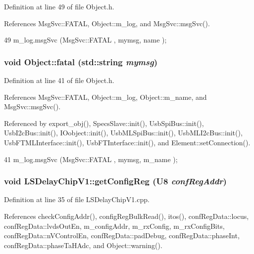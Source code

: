 Definition at line 49 of file Object.h.

References MsgSvc::FATAL, Object::m\_\-log, and MsgSvc::msgSvc().


\begin{DoxyCode}
49 { m_log.msgSvc (MsgSvc::FATAL   , mymsg, name ); }
\end{DoxyCode}
\hypertarget{classObject_aad5a16aac7516ce65bd5ec02ab07fc80}{
\subsubsection[{fatal}]{\setlength{\rightskip}{0pt plus 5cm}void Object::fatal (std::string {\em mymsg})}}
\label{classObject_aad5a16aac7516ce65bd5ec02ab07fc80}


Definition at line 41 of file Object.h.

References MsgSvc::FATAL, Object::m\_\-log, Object::m\_\-name, and MsgSvc::msgSvc().

Referenced by export\_\-obj(), SpecsSlave::init(), UsbSpiBus::init(), UsbI2cBus::init(), IOobject::init(), UsbMLSpiBus::init(), UsbMLI2cBus::init(), UsbFTMLInterface::init(), UsbFTInterface::init(), and Element::setConnection().


\begin{DoxyCode}
41 { m_log.msgSvc (MsgSvc::FATAL   , mymsg, m_name ); }
\end{DoxyCode}
\hypertarget{classLSDelayChipV1_a4f338071d49df7eae55020a5f5fa8474}{
\subsubsection[{getConfigReg}]{\setlength{\rightskip}{0pt plus 5cm}void LSDelayChipV1::getConfigReg ({\bf U8} {\em confRegAddr})}}
\label{classLSDelayChipV1_a4f338071d49df7eae55020a5f5fa8474}


Definition at line 35 of file LSDelayChipV1.cpp.

References checkConfigAddr(), configRegBulkRead(), itos(), confRegData::locus, confRegData::lvdsOutEn, m\_\-configAddr, m\_\-rxConfig, m\_\-rxConfigBits, confRegData::nVControlEn, confRegData::padDebug, confRegData::phaseInt, confRegData::phaseTaHAdc, and Object::warning().


